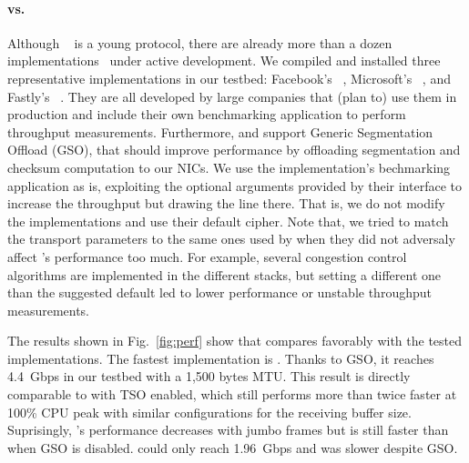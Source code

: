\paragraph{\tcpls vs. \quic}
Although \quic~\cite{draft-ietf-quic-transport} is a young protocol, there are
already more than a dozen implementations~\cite{marx2020same,quicimplem,yang2020making} under active
development. We compiled and installed three representative \quic implementations in our testbed: Facebook's \mvfst~\cite{mvfst-github,Joras_mvfst}, Microsoft's \msquic~\cite{msquic-github}, and Fastly's
\quicly~\cite{quicly-github}. They are all developed by large companies that (plan to) use them in production and include their own benchmarking application to perform throughput measurements. Furthermore, \mvfst and \quicly support Generic Segmentation Offload (GSO), that should improve performance by offloading \udp segmentation and checksum computation to our NICs. We use the
implementation's bechmarking application as is, exploiting the optional
arguments provided by their interface to increase the throughput but drawing the
line there. That is, we do not modify the \quic implementations and use their default cipher. Note that, we tried to match the transport parameters to the same ones used by \tcpls when they did not adversaly affect \quic's performance too much. For example, several congestion control algorithms are implemented in the different \quic stacks, but setting a different one than the suggested default led to lower performance or unstable throughput measurements.

The results shown in Fig.~\ref{fig:perf} show that \tcpls compares favorably
with the tested \quic implementations. The fastest \quic implementation is
\quicly. Thanks to GSO, it reaches 4.4~Gbps in our testbed with a 1,500 bytes
MTU. This result is directly comparable to \tcpls with TSO enabled, which still
performs more than twice faster at 100\% CPU peak with similar configurations
for the receiving buffer size. Suprisingly, \quicly's performance decreases with
jumbo frames but is still faster than when GSO is disabled.
\msquic could only reach 1.96~Gbps and \mvfst was slower despite GSO.




